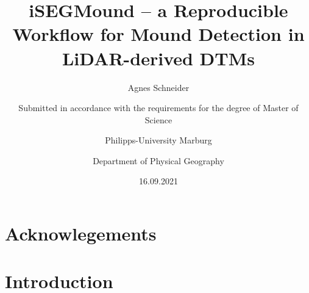 \documentclass[
]{article}
\title{iSEGMound -- a Reproducible Workflow for Mound Detection in LiDAR-derived DTMs}
\subtitle{Agnes Schneider}
\author{Submitted in accordance with the requirements for the degree of Master of Science\textsuperscript{} \and Philipps-University Marburg\textsuperscript{} \and Department of Physical Geography\textsuperscript{}}
\date{16.09.2021}
\begin{document}
\maketitle

{
\setcounter{tocdepth}{2}
\tableofcontents
}
\newpage

\hypertarget{acknowlegements}{%
\section*{Acknowlegements}\label{acknowlegements}}

\newpage


\hypertarget{introduction}{%
\section{Introduction}\label{introduction}}
\end{document}
